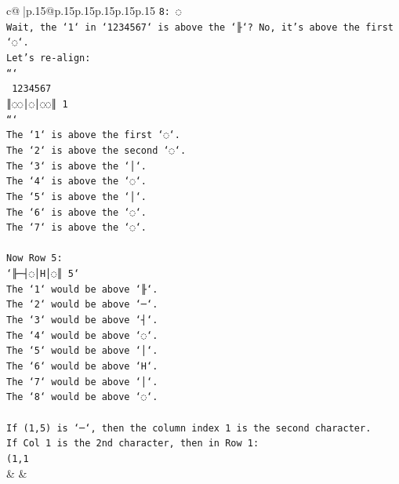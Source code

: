 \documentclass{article}
\begin{document}
{\begin{supertabular}{c@{$\;$}|p{.15\linewidth}@{}p{.15\linewidth}p{.15\linewidth}p{.15\linewidth}p{.15\linewidth}p{.15\linewidth}}
{{{\texttt{8: ◌} \\
\texttt{Wait, the `1` in `1234567` is above the `╟`? No, it's above the first `◌`.} \\
\texttt{Let's re{-}align:} \\
\texttt{```} \\
\texttt{ 1234567} \\
\texttt{║◌◌│◌│◌◌║ 1} \\
\texttt{```} \\
\texttt{The `1` is above the first `◌`.} \\
\texttt{The `2` is above the second `◌`.} \\
\texttt{The `3` is above the `│`.} \\
\texttt{The `4` is above the `◌`.} \\
\texttt{The `5` is above the `│`.} \\
\texttt{The `6` is above the `◌`.} \\
\texttt{The `7` is above the `◌`.} \\
\\ 
\texttt{Now Row 5:} \\
\texttt{`╟─┤◌│H│◌║ 5`} \\
\texttt{The `1` would be above `╟`.} \\
\texttt{The `2` would be above `─`.} \\
\texttt{The `3` would be above `┤`.} \\
\texttt{The `4` would be above `◌`.} \\
\texttt{The `5` would be above `│`.} \\
\texttt{The `6` would be above `H`.} \\
\texttt{The `7` would be above `│`.} \\
\texttt{The `8` would be above `◌`.} \\
\\ 
\texttt{If (1,5) is `─`, then the column index 1 is the second character.} \\
\texttt{If Col 1 is the 2nd character, then in Row 1:} \\
\texttt{(1,1} \\
            }
        }
    }
    & & \\ \\


\end{supertabular}}
\end{document}
